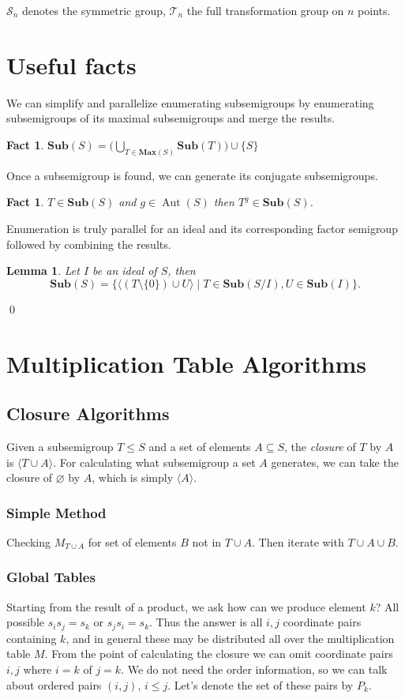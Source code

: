 \documentclass{amsart}
\newcommand{\cT}{{\mathcal T}}
\newcommand{\cS}{{\mathcal S}}
\newcommand{\Sub}{\mathbf{Sub}}
\newcommand{\Max}{\mathbf{Max}}
\DeclareMathOperator{\Aut}{Aut}
\theoremstyle{plain}
\newtheorem{lemma}[theorem]{Lemma}
\newtheorem{fact}[theorem]{Fact}
\theoremstyle{definition}
\begin{document}
$\cS_n$ denotes the symmetric group, $\cT_n$ the full transformation group on $n$ points.
\section{Useful facts}
We can simplify and parallelize enumerating subsemigroups by enumerating subsemigroups of its maximal subsemigroups and merge the results.
\begin{fact}
$\Sub(S)=\big( \bigcup_{T\in \Max(S)}\Sub(T)\big)\cup \{S\}$
\end{fact}

Once a subsemigroup is found, we can generate its conjugate subsemigroups.
\begin{fact}
$T\in\Sub(S)$ and $g\in \Aut(S)$ then $T^g\in\Sub(S)$.%
\end{fact}


Enumeration is truly parallel for an ideal and its corresponding factor semigroup followed by combining the results.
\begin{lemma}
Let $I$ be an ideal of $S$, then $$\Sub(S)=\big\{\langle (T\setminus\{0\})\cup U \rangle\mid T\in \Sub(S/I), U\in\Sub(I)\big\}.$$
\end{lemma}
\proof

\qed

\section{Multiplication Table Algorithms}

\subsection{Closure Algorithms}
Given a subsemigroup $T\leq S$ and a set of elements  $A\subseteq S$, the \emph{closure} of $T$ by $A$ is $\langle T\cup A \rangle$.
For calculating what subsemigroup a set $A$ generates, we can take the closure of $\varnothing$ by $A$, which is simply $\langle A\rangle$.

\subsubsection{Simple Method}
Checking $M_{T\cup A}$ for set of elements $B$ not in $T\cup A$. Then iterate with $T\cup A\cup B$.
\subsubsection{Global Tables}
Starting from the result of a product, we ask how can we produce element $k$?
All possible $s_is_j=s_k$ or $s_js_i=s_k$.
Thus the  answer is all $i,j$ coordinate pairs containing $k$, and in general these may be distributed all over the multiplication table $M$.
From the point of calculating the closure we can  omit coordinate pairs $i,j$ where $i=k$ of $j=k$. 
We do not need the order information, so we can talk about ordered pairs $(i,j)$, $i\leq j$. 
Let's denote the set of these pairs by $P_k$.
\end{document}
